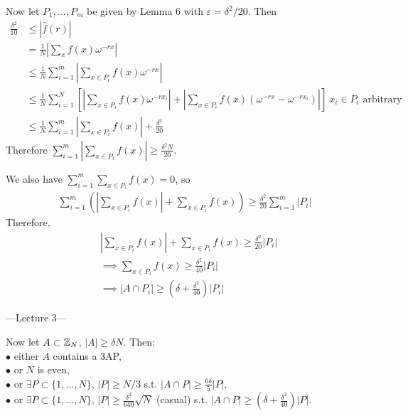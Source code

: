 \documentclass[a4paper]{article}
\begin{document}
Now let $P_1,...,P_m$ be given by Lemma 6 with $\varepsilon = \delta^2/20$. Then
\begin{equation*}
    \begin{aligned}
        \frac{\delta^2}{10} &\leq |\hat{f}(r)|\\
        &= \frac{1}{N} |\sum_x f(x) \omega^{-rx}|\\
        &\leq \frac{1}{N} \sum_{i=1}^m |\sum_{x \in P_i} f(x) \omega^{-rx}|\\
        &\leq \frac{1}{N} \sum_{i=1}^N \left[\left|\sum_{x \in P_i} f(x) \omega^{-rx_i}\right| + \left|\sum_{x \in P_i} f(x) (\omega^{-rx} - \omega^{-rx_i})\right|\right] \ x_i \in P_i \text{ arbitrary}\\
        &\leq \frac{1}{N} \sum_{i=1}^m |\sum_{x \in P_i} f(x)| + \frac{\delta^2}{20}
    \end{aligned}
\end{equation*}
Therefore $\sum_{i=1}^m \left|\sum_{x \in P_i} f(x)\right| \geq \frac{\delta^2 N}{20}$.

We also have $\sum_{i=1}^m \sum_{x\in P_i} f(x) = 0$, so
\begin{equation*}
    \begin{aligned}
        \sum_{i=1}^m \left(\left|\sum_{x \in P_i} f(x) \right| + \sum_{x \in P_i}f(x) \right) \geq \frac{\delta^2}{20} \sum_{i=1}^m |P_i|
    \end{aligned}
\end{equation*}
Therefore, 
\begin{equation*}
    \begin{aligned}
        &|\sum_{x \in P_i} f(x)| + \sum_{x \in P_i} f(x) \geq \frac{\delta^2}{20} |P_i|\\
        &\implies \sum_{x \in P_i} f(x) \geq \frac{\delta^2}{40}|P_i|\\
        &\implies |A \cap P_i| \geq \left(\delta+\frac{\delta^2}{40}\right)|P_i|
    \end{aligned}
\end{equation*}

---Lecture 3---

Now let $A \subset \mathbb{Z}_N$, $|A| \geq \delta N$. Then:\\
$\bullet$ either $A$ contains a 3AP,\\
$\bullet$ or $N$ is even,\\
$\bullet$ or $\exists P \subset \{1,...,N\}$, $|P| \geq N/3$ s.t. $|A \cap P| \geq \frac{6\delta}{5} |P|$,\\
$\bullet$ or $\exists P \subset \{1,...,N\}$, $|P|\geq \frac{\delta^2}{640}\sqrt{N}$ (casual) s.t. $|A\cap P| \geq (\delta+\frac{\delta^2}{40})|P|$.
\end{document}
